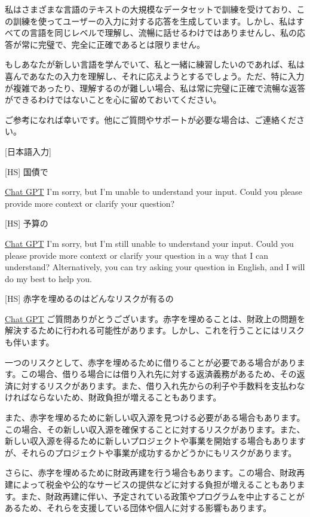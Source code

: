 \documentclass[
]{book}
\theoremstyle{definition}
\theoremstyle{definition}
\theoremstyle{definition}
\theoremstyle{definition}
\theoremstyle{remark}
\begin{document}
私はさまざまな言語のテキストの大規模なデータセットで訓練を受けており、この訓練を使ってユーザーの入力に対する応答を生成しています。しかし、私はすべての言語を同じレベルで理解し、流暢に話せるわけではありませんし、私の応答が常に完璧で、完全に正確であるとは限りません。

もしあなたが新しい言語を学んでいて、私と一緒に練習したいのであれば、私は喜んであなたの入力を理解し、それに応えようとするでしょう。ただ、特に入力が複雑であったり、理解するのが難しい場合、私は常に完璧に正確で流暢な返答ができるわけではないことを心に留めておいてください。

ご参考になれば幸いです。他にご質問やサポートが必要な場合は、ご連絡ください。

{[}日本語入力{]}

{[}HS{]} 国債で

\protect\hyperlink{chatgpt}{Chat GPT} I'm sorry, but I'm unable to understand your input. Could you please provide more context or clarify your question?

{[}HS{]} 予算の

\protect\hyperlink{chatgpt}{Chat GPT} I'm sorry, but I'm still unable to understand your input. Could you please provide more context or clarify your question in a way that I can understand? Alternatively, you can try asking your question in English, and I will do my best to help you.

{[}HS{]} 赤字を埋めるのはどんなリスクが有るの

\protect\hyperlink{chatgpt}{Chat GPT} ご質問ありがとうございます。赤字を埋めることは、財政上の問題を解決するために行われる可能性があります。しかし、これを行うことにはリスクも伴います。

一つのリスクとして、赤字を埋めるために借りることが必要である場合があります。この場合、借りる場合には借り入れ先に対する返済義務があるため、その返済に対するリスクがあります。また、借り入れ先からの利子や手数料を支払わなければならないため、財政負担が増えることもあります。

また、赤字を埋めるために新しい収入源を見つける必要がある場合もあります。この場合、その新しい収入源を確保することに対するリスクがあります。また、新しい収入源を得るために新しいプロジェクトや事業を開始する場合もありますが、それらのプロジェクトや事業が成功するかどうかにもリスクがあります。

さらに、赤字を埋めるために財政再建を行う場合もあります。この場合、財政再建によって税金や公的なサービスの提供などに対する負担が増えることもあります。また、財政再建に伴い、予定されている政策やプログラムを中止することがあるため、それらを支援している団体や個人に対する影響もあります。
\end{document}
